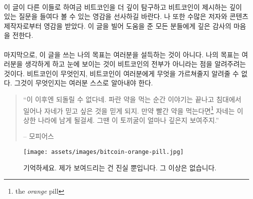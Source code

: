 \paragraph{}
이 글이 다른 이들로 하여금 비트코인을 더 깊이 탐구하고 비트코인이 제시하는 깊이 있는 질문을 들여다 볼 수 있는 영감을 선사하길 바란다. 
나 또한 수많은 저자와 콘텐츠 제작자로부터 영감을 받았다. 이 글을 빌어 도움을 준 모든 분들에게 깊은 감사의 마음을 전한다.


\paragraph{}
마지막으로, 이 글을 쓰는 나의 목표는 여러분을 설득하는 것이 아니다. 
나의 목표는 여러분을 생각하게 하고 눈에 보이는 것이 비트코인의 전부가 아니라는 점을 알려주려는 것이다.
비트코인이 무엇인지, 비트코인이 여러분에게 무엇을 가르쳐줄지 알려줄 수 없다. 
그것이 무엇인지는 여러분 스스로 알아내야 한다.

\begin{quotation}\begin{samepage}
\enquote{이 이후엔 되돌릴 수 없다네. 파란 약을 먹는 순간 이야기는 끝나고 침대에서 일어나 자네가 믿고 싶은 것을 믿게 되지.
	만약 빨간 약을 먹는다면\footnote{the \textit{orange} pill} 자네는 이상한 나라에 남게 될걸세. 
	그땐 이 토끼굴이 얼마나 깊은지 보여주지.}
\begin{flushright} -- 모피어스
\end{flushright}\end{samepage}\end{quotation}
	
\begin{figure}
\texttt{[image: assets/images/bitcoin-orange-pill.jpg]}
\caption*{기억하세요. 제가 보여드리는 건 진실 뿐입니다. 그 이상은 없습니다.}
\label{fig:bitcoin-orange-pill}
\end{figure}

%
%
%
